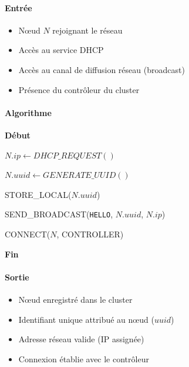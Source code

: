 \documentclass[12pt,a4paper]{report}
\theoremstyle{definition}
\begin{document}
\paragraph{Entrée}
\begin{itemize}
    \item[$\bullet$] Nœud $N$ rejoignant le réseau
    \item[$\bullet$] Accès au service DHCP
    \item[$\bullet$]Accès au canal de diffusion réseau (broadcast)
    \item [$\bullet$]Présence du contrôleur du cluster
\end{itemize}

\paragraph{Algorithme}

\begin{algorithm}[H]
\caption{Entrée d’un nœud dans le réseau}
\label{alg:node_join}


\textbf{Début}

$N.ip \leftarrow DHCP\_REQUEST()$

$N.uuid \leftarrow GENERATE\_UUID()$

STORE\_LOCAL($N.uuid$)

SEND\_BROADCAST(\texttt{HELLO}, $N.uuid$, $N.ip$)


CONNECT($N$, CONTROLLER)

\textbf{Fin}

\end{algorithm}

\paragraph{Sortie}
\begin{itemize}
    \item[$\bullet$] Nœud enregistré dans le cluster
    \item [$\bullet$]Identifiant unique attribué au nœud ($uuid$)
    \item [$\bullet$]Adresse réseau valide (IP assignée)
    \item [$\bullet$]Connexion établie avec le contrôleur
\end{itemize}
\end{document}
